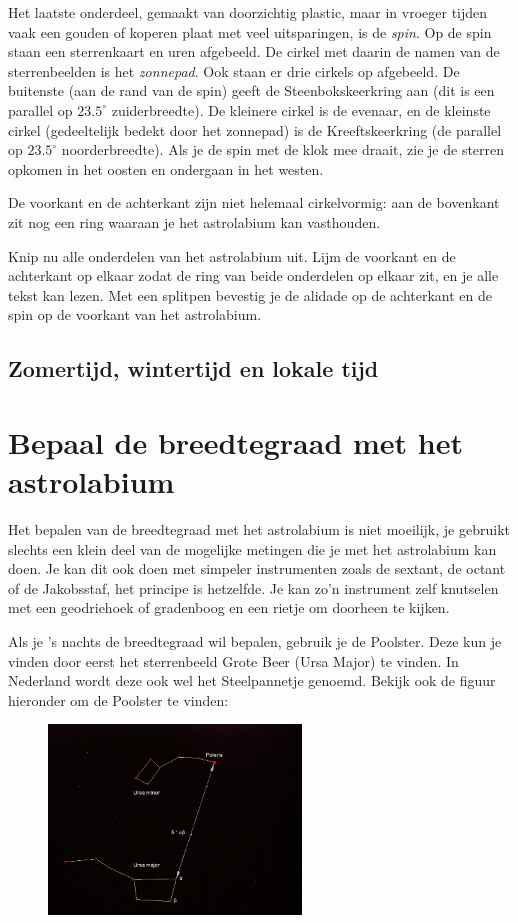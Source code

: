 Het laatste onderdeel, gemaakt van doorzichtig plastic, maar in vroeger tijden vaak een gouden of koperen plaat met veel uitsparingen, is de \textit{spin}. Op de spin staan een sterrenkaart en uren afgebeeld. De cirkel met daarin de namen van de sterrenbeelden is het \textit{zonnepad}. Ook staan er drie cirkels op afgebeeld. De buitenste (aan de rand van de spin) geeft de Steenbokskeerkring aan (dit is een parallel op $23.5^{\circ}$ zuiderbreedte).  De kleinere cirkel is de evenaar, en de kleinste cirkel (gedeeltelijk bedekt door het zonnepad) is de Kreeftskeerkring (de parallel op $23.5^{\circ}$ noorderbreedte). Als je de spin met de klok mee draait, zie je de sterren opkomen in het oosten en ondergaan in het westen.

De voorkant en de achterkant zijn niet helemaal cirkelvormig: aan de bovenkant zit nog een ring waaraan je het astrolabium kan vasthouden.

\begin{opgave}[\schaar]
 Knip nu alle onderdelen van het astrolabium uit. Lijm de voorkant en de achterkant op elkaar zodat de ring van beide onderdelen op elkaar zit, en je alle tekst kan lezen. Met een splitpen bevestig je de alidade op de achterkant en de spin op de voorkant van het astrolabium.
\end{opgave}

\subsection*{Zomertijd, wintertijd en lokale tijd}


\section{Bepaal de breedtegraad met het astrolabium}
Het bepalen van de breedtegraad met het astrolabium is niet moeilijk, je gebruikt slechts een klein deel van de mogelijke metingen die je met het astrolabium kan doen. Je kan dit ook doen met simpeler instrumenten zoals de sextant, de octant of de Jakobsstaf, het principe is hetzelfde. Je kan zo'n instrument zelf knutselen met een geodriehoek of gradenboog en een rietje om doorheen te kijken.

Als je 's nachts de breedtegraad wil bepalen, gebruik je de Poolster. Deze kun je vinden door eerst het sterrenbeeld Grote Beer (Ursa Major) te vinden. In Nederland wordt deze ook wel het Steelpannetje genoemd. Bekijk ook de figuur hieronder om de Poolster te vinden:
\begin{figure}[h]
\centering
 \includegraphics[width=0.6\textwidth]{Polaris.jpg}
\end{figure}

